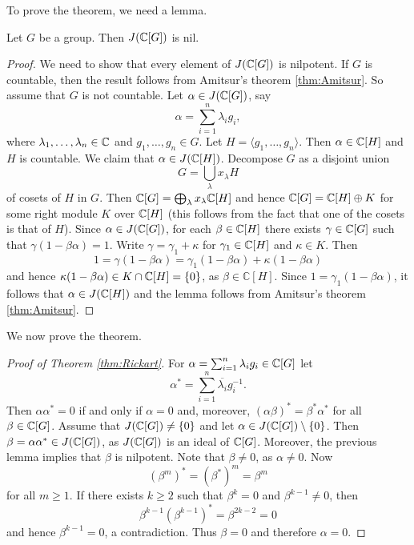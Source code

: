 To prove the theorem, we need a lemma.

\begin{lemma}
Let $G$ be a group. Then $J(\mathbb{C}[G])$ is nil.        
\end{lemma}

\begin{proof}
    We need to show that every element of $J(\mathbb{C}[G])$ is nilpotent. 
    If $G$ is countable, then the result follows from Amitsur's theorem \ref{thm:Amitsur}. So assume that 
    $G$ is not countable. Let $\alpha\in J(\mathbb{C}[G])$, say
    \[
    \alpha=\sum_{i=1}^n\lambda_ig_i,
    \]
    where $\lambda_1,\dots,\lambda_n\in\mathbb{C}$ and $g_1,\dots,g_n\in G$. Let $H=\langle g_1,\dots,g_n\rangle$.
    Then $\alpha\in \mathbb{C}[H]$ and $H$ is countable. We claim that $\alpha\in J(\mathbb{C}[H])$. Decompose
    $G$ as a disjoint union 
    \[
    G=\bigcup_\lambda x_\lambda H
    \]
    of cosets of $H$ in $G$. Then $\mathbb{C}[G]=\bigoplus_\lambda x_\lambda\mathbb{C}[H]$ and
    hence $\mathbb{C}[G]=\mathbb{C}[H]\oplus K$ for some right module $K$ over $\mathbb{C}[H]$ (this follows
    from the fact that one of the cosets is that of $H$). Since $\alpha\in J(\mathbb{C}[G])$, for each 
    $\beta\in\mathbb{C}[H]$ there exists $\gamma\in\mathbb{C}[G]$ such that 
    $\gamma(1-\beta\alpha)=1$. Write $\gamma=\gamma_1+\kappa$ for $\gamma_1\in\mathbb{C}[H]$ and $\kappa\in K$. Then
    \[
    1=\gamma(1-\beta\alpha)=\gamma_1(1-\beta\alpha)+\kappa(1-\beta\alpha)
    \]
    and hence $\kappa(1-\beta\alpha)\in K\cap \mathbb{C}[H]=\{0\}$, as $\beta\in\mathbb{C}[H]$. 
    Since $1=\gamma_1(1-\beta\alpha)$, it follows that
    $\alpha\in J(\mathbb{C}[H])$ and the lemma follows from Amitsur's theorem \ref{thm:Amitsur}.  
\end{proof}

We now prove the theorem. 

\begin{proof}[Proof of Theorem \ref{thm:Rickart}]
    For $\alpha=\sum_{i=1}^n\lambda_ig_i\in\mathbb{C}[G]$ let 
    \[
    \alpha^*=\sum_{i=1}^n\overline{\lambda_i}g_i^{-1}.
    \]
    Then $\alpha\alpha^*=0$ if and only if $\alpha=0$ and, moreover, 
    $(\alpha\beta)^*=\beta^*\alpha^*$ for all $\beta\in\mathbb{C}[G]$. 
    Assume that $J(\mathbb{C}[G])\ne\{0\}$ and let $\alpha\in J(\mathbb{C}[G])\setminus\{0\}$. Then
    $\beta=\alpha\alpha^*\in J(\mathbb{C}[G])$, as $J(\mathbb{C}[G])$ is an ideal of $\mathbb{C}[G]$. Moreover, the previous 
    lemma implies that $\beta$ is nilpotent. Note that $\beta\ne 0$, as $\alpha\ne0$. Now  
    \[
    (\beta^m)^*=(\beta^*)^m=\beta^m
    \]
    for all $m\geq1$. If there exists $k\geq2$ such that $\beta^k=0$ and $\beta^{k-1}\ne 0$, then
    \[
    \beta^{k-1}\left(\beta^{k-1}\right)^*=\beta^{2k-2}=0
    \]
    and hence $\beta^{k-1}=0$, a contradiction. Thus $\beta=0$ and therefore $\alpha=0$. 
\end{proof}

